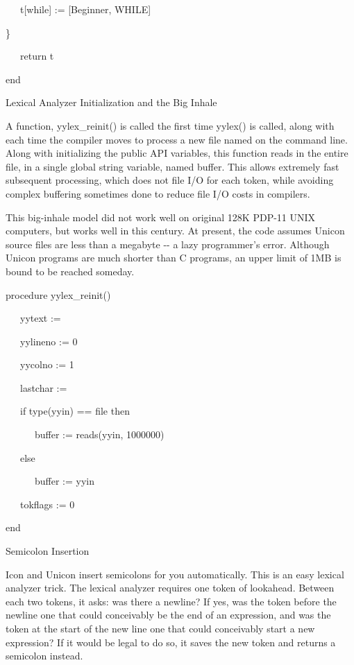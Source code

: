 {\ttfamily\mdseries
\ \ \ t[{\textquotedbl}while{\textquotedbl}] := [Beginner, WHILE]}

{\ttfamily\mdseries
\}}

{\ttfamily\mdseries
\ \ \ return t}

{\ttfamily\mdseries
end}

{\sffamily
Lexical Analyzer Initialization and the Big Inhale }


A function, yylex\_reinit() is called the first time yylex() is
called, along with each time the compiler moves to process a new file
named on the command line. Along with initializing the public API
variables, this function reads in the entire file, in a single global
string variable, named {\textquotedbl}buffer{\textquotedbl}. This
allows extremely fast subsequent processing, which does not file I/O
for each token, while avoiding complex buffering sometimes done to
reduce file I/O costs in compilers.

This {\textquotedbl}big-inhale{\textquotedbl} model did not work well
on original 128K PDP-11 UNIX computers, but works well in this
century. At present, the code assumes Unicon source files are less
than a megabyte -{}- a lazy programmer's error. Although Unicon
programs are much shorter than C programs, an upper limit of 1MB is
bound to be reached someday.

{\ttfamily\mdseries
procedure yylex\_reinit()}

{\ttfamily\mdseries
\ \ \ yytext := {\textquotedbl}{\textquotedbl}}

{\ttfamily\mdseries
\ \ \ yylineno := 0}

{\ttfamily\mdseries
\ \ \ yycolno := 1}

{\ttfamily\mdseries
\ \ \ lastchar := {\textquotedbl}{\textquotedbl}}

{\ttfamily\mdseries
\ \ \ if type(yyin) == {\textquotedbl}file{\textquotedbl} then}

{\ttfamily\mdseries
\ \ \ \ \ \ buffer := reads(yyin, 1000000)}

{\ttfamily\mdseries
\ \ \ else}

{\ttfamily\mdseries
\ \ \ \ \ \ buffer := yyin}

{\ttfamily\mdseries
\ \ \ tokflags := 0}

{\ttfamily\mdseries
end}

{\sffamily
Semicolon Insertion }


Icon and Unicon insert semicolons for you automatically. This is an
easy lexical analyzer trick. The lexical analyzer requires one token
of lookahead. Between each two tokens, it asks: was there a newline?
If yes, was the token before the newline one that could conceivably be
the end of an expression, and was the token at the start of the new
line one that could conceivably start a new expression? If it would be
legal to do so, it saves the new token and returns a semicolon
instead.


